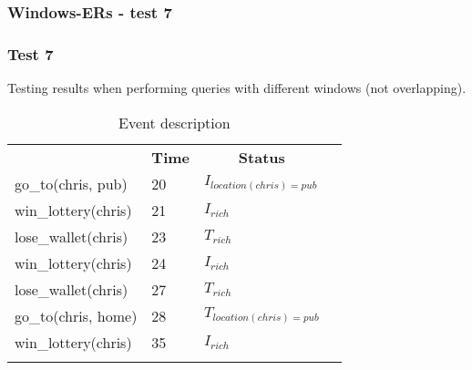 \documentclass[8pt]{beamer}
\begin{document}
\begin{frame}
    \frametitle{Windows-ERs - test 7}
    \subsubsection{Test 7}
    \small
    Testing results when performing queries with different windows (not overlapping).
    \begin{minipage}{0.48\linewidth}
        \begin{table}[t!]
            \caption{Event description}
            \begin{center}
                \begin{tabular}{llll}
                    \hline\noalign{\smallskip}
                    \multicolumn{1}{l}{\textbf{Event}} & \multicolumn{1}{c}{\textbf{Time}} & \multicolumn{1}{c}{\textbf{Status}}  \\
                    go\_to(chris, pub)& 20 & $I_{location(chris)=pub}$\\
                    win\_lottery(chris)&21 &$I_{rich}$\\
                    lose\_wallet(chris)& 23 &$T_{rich}$\\
                    win\_lottery(chris)& 24 &$I_{rich}$\\
                    lose\_wallet(chris)& 27 &$T_{rich}$\\
                    go\_to(chris, home)& 28 &$T_{location(chris)=pub}$\\
                    win\_lottery(chris)& 35&$I_{rich}$\\
                    \noalign{\smallskip}
                    \hline
                \end{tabular}
            \end{center}
        \end{table}
    \end{minipage}
    \begin{minipage}{0.48\linewidth}


\end{minipage}
\end{frame}
\end{document}
